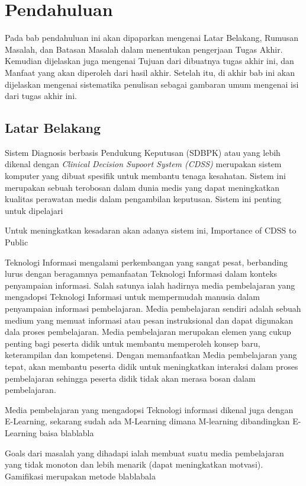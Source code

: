 \chapter{Pendahuluan}
Pada bab pendahuluan ini akan dipaparkan mengenai Latar Belakang, Rumusan Masalah, dan Batasan Masalah dalam menentukan pengerjaan Tugas Akhir.
Kemudian dijelaskan juga mengenai Tujuan dari dibuatnya tugas akhir ini, dan Manfaat yang akan diperoleh dari hasil akhir.
Setelah itu, di akhir bab ini akan dijelaskan mengenai sistematika penulisan sebagai gambaran umum mengenai isi dari tugas akhir ini.

\section{Latar Belakang}
Sistem Diagnosis berbasis Pendukung Keputusan (SDBPK) atau yang lebih dikenal dengan \textit{Clinical Decision Supoort System (CDSS)}
merupakan sistem komputer yang dibuat spesifik untuk membantu tenaga kesahatan.
Sistem ini merupakan sebuah terobosan dalam dunia medis yang dapat meningkatkan kualitas perawatan medis dalam pengambilan keputusan.
Sistem ini penting untuk dipelajari

Untuk meningkatkan kesadaran akan adanya sistem ini, 
Importance of CDSS to Public

Teknologi Informasi mengalami perkembangan yang sangat pesat, berbanding lurus dengan beragamnya pemanfaatan Teknologi Informasi dalam konteks penyampaian informasi.
Salah satunya ialah hadirnya media pembelajaran yang mengadopsi Teknologi Informasi untuk mempermudah manusia dalam penyampaian informasi pembelajaran.
Media pembelajaran sendiri adalah sebuah medium yang memuat informasi atau pesan instruksional dan dapat digunakan dala proses pembelajaran.
Media pembelajaran merupakan elemen yang cukup penting bagi peserta didik untuk membantu memperoleh konsep baru, keterampilan dan kompetensi.
Dengan memanfaatkan Media pembelajaran yang tepat, akan membantu peserta didik untuk meningkatkan interaksi dalam proses pembelajaran 
sehingga peserta didik tidak akan merasa bosan dalam pembelajaran\cite{hasan2021media}.

Media pembelajaran yang mengadopsi Teknologi informasi dikenal juga dengan E-Learning, sekarang sudah ada M-Learning dimana M-learning dibandingkan E-Learning baisa blablabla

Goals dari masalah yang dihadapi ialah membuat suatu media pembelajaran yang tidak monoton dan lebih menarik (dapat meningkatkan motvasi).
Gamifikasi merupakan metode blablabala


